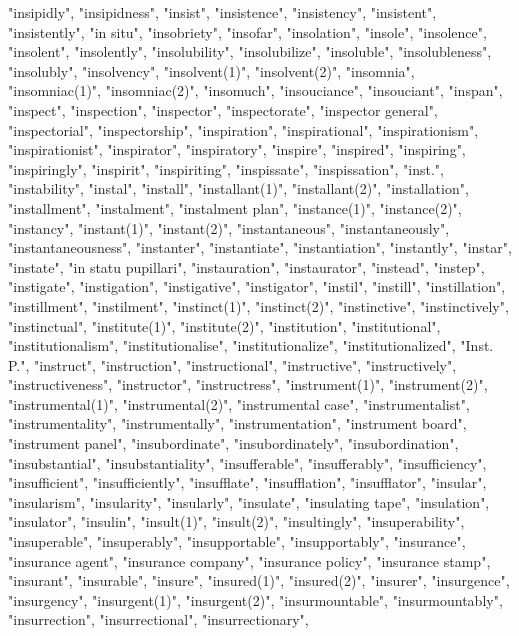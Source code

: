 "insipidly",
"insipidness",
"insist",
"insistence",
"insistency",
"insistent",
"insistently",
"in situ",
"insobriety",
"insofar",
"insolation",
"insole",
"insolence",
"insolent",
"insolently",
"insolubility",
"insolubilize",
"insoluble",
"insolubleness",
"insolubly",
"insolvency",
"insolvent(1)",
"insolvent(2)",
"insomnia",
"insomniac(1)",
"insomniac(2)",
"insomuch",
"insouciance",
"insouciant",
"inspan",
"inspect",
"inspection",
"inspector",
"inspectorate",
"inspector general",
"inspectorial",
"inspectorship",
"inspiration",
"inspirational",
"inspirationism",
"inspirationist",
"inspirator",
"inspiratory",
"inspire",
"inspired",
"inspiring",
"inspiringly",
"inspirit",
"inspiriting",
"inspissate",
"inspissation",
"inst.",
"instability",
"instal",
"install",
"installant(1)",
"installant(2)",
"installation",
"installment",
"instalment",
"instalment plan",
"instance(1)",
"instance(2)",
"instancy",
"instant(1)",
"instant(2)",
"instantaneous",
"instantaneously",
"instantaneousness",
"instanter",
"instantiate",
"instantiation",
"instantly",
"instar",
"instate",
"in statu pupillari",
"instauration",
"instaurator",
"instead",
"instep",
"instigate",
"instigation",
"instigative",
"instigator",
"instil",
"instill",
"instillation",
"instillment",
"instilment",
"instinct(1)",
"instinct(2)",
"instinctive",
"instinctively",
"instinctual",
"institute(1)",
"institute(2)",
"institution",
"institutional",
"institutionalism",
"institutionalise",
"institutionalize",
"institutionalized",
"Inst. P.",
"instruct",
"instruction",
"instructional",
"instructive",
"instructively",
"instructiveness",
"instructor",
"instructress",
"instrument(1)",
"instrument(2)",
"instrumental(1)",
"instrumental(2)",
"instrumental case",
"instrumentalist",
"instrumentality",
"instrumentally",
"instrumentation",
"instrument board",
"instrument panel",
"insubordinate",
"insubordinately",
"insubordination",
"insubstantial",
"insubstantiality",
"insufferable",
"insufferably",
"insufficiency",
"insufficient",
"insufficiently",
"insufflate",
"insufflation",
"insufflator",
"insular",
"insularism",
"insularity",
"insularly",
"insulate",
"insulating tape",
"insulation",
"insulator",
"insulin",
"insult(1)",
"insult(2)",
"insultingly",
"insuperability",
"insuperable",
"insuperably",
"insupportable",
"insupportably",
"insurance",
"insurance agent",
"insurance company",
"insurance policy",
"insurance stamp",
"insurant",
"insurable",
"insure",
"insured(1)",
"insured(2)",
"insurer",
"insurgence",
"insurgency",
"insurgent(1)",
"insurgent(2)",
"insurmountable",
"insurmountably",
"insurrection",
"insurrectional",
"insurrectionary",
